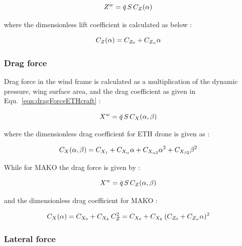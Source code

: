 \begin{equation}{\label{eqn:liftForce}}
Z^w = \bar{q} \, S \,  C_Z(\alpha)
\end{equation}

where the dimensionless lift coefficient is calculated as below :

\begin{equation}{\label{eqn:liftCoef}}
C_Z(\alpha) = C_{Z_0} + C_{Z_{\alpha}} \alpha 
\end{equation}



\subsubsection{Drag force}

Drag force in the wind frame is calculated as a multiplication of the dynamic pressure, wing surface area, and the drag coefficient as given in Equ.~\ref{eqn:dragForceETHcraft} :

\begin{equation}{\label{eqn:dragForceETHcraft}}
X^w = \bar{q} \, S \,  C_X(\alpha, \beta)
\end{equation}

where the dimensionless drag coefficient for ETH drone is given as :

\begin{equation}{\label{eqn:dragCoeffETHcraft}}
C_X(\alpha, \beta) = C_{X_1} + C_{X_{\alpha}} \alpha + C_{X_{\alpha 2}} {\alpha}^2 + C_{X_{\beta 2}} {\beta}^2 
\end{equation}

While for MAKO the drag force is given by \cite{bronz2016aerodynamic} :

\begin{equation}{\label{eqn:dragForceMAKO}}
X^w = \bar{q} \, S \, C_{Z}(\alpha, \beta)
\end{equation}

and the dimensionless drag coefficient for MAKO \cite{bronz2016aerodynamic} :

\begin{equation}{\label{eqn:dragCoeffMAKO}}
C_X(\alpha) = C_{X_0} + C_{X_k} \, C_Z^2 = C_{X_0} + C_{X_k} \, (C_{Z_0} + C_{Z_{\alpha}} \alpha )^2
\end{equation}


\subsubsection{Lateral force}

